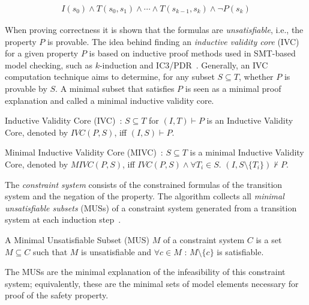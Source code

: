 \begin{gather*}
I(s_0) \land T(s_0, s_1) \land \cdots \land T(s_{k-1}, s_{k})
\land \neg P(s_{k})
\end{gather*}

When proving correctness it is shown that the formulas are \emph{unsatisfiable}, i.e., the property $P$ is provable. The idea behind finding an {\em inductive validity core} (IVC) for a given property $P$ is based on inductive proof methods used in SMT-based model checking, such as $\mathit{k}$-induction and IC3/PDR~\cite{een2011efficient, kahsai2012incremental}. Generally, an IVC computation technique aims to determine, for any subset $S \subseteq T$, whether $\mathit{P}$ is provable by $\mathit{S}$. A minimal subset that satisfies $\mathit{P}$ is seen as a minimal proof explanation and called a minimal inductive validity core. %

\begin{definition}
Inductive Validity Core (IVC)~\cite{GhassabaniGW16}: $S \subseteq T$ for $(I, T) \vdash P$ is an Inductive Validity Core, denoted by $\mathit{IVC(P,S)}$, iff $\mathit{(I,S)} \vdash P$.
\end{definition}

\begin{definition}
Minimal Inductive Validity Core (MIVC)~\cite{Ghassabani2017EfficientGO}: $S \subseteq T$ is a minimal Inductive Validity Core, denoted by $\mathit{MIVC(P,S)}$, iff $\mathit{IVC(P,S)} \land \forall T_i \in S$. $(I, S \setminus \{T_i\}) \not \vdash P$.
\end{definition}

The {\em constraint system} consists of the constrained formulas of the transition system and the negation of the property. The \aivcalg algorithm collects all {\em minimal unsatisfiable subsets} (MUSs) of a constraint system generated from a transition system at each induction step~\cite{Ghassabani2017EfficientGO,bendik2018online}. 

\begin{definition}
A Minimal Unsatisfiable Subset (MUS) $M$ of a constraint system $C$ is a set $M \subseteq C$ such that $M$ is unsatisfiable and $\forall c \in M$ : $M \setminus \{c\}$ is satisfiable.
\end{definition}
The MUSs are the minimal explanation of the infeasibility of this constraint system; equivalently, these are the minimal sets of model elements necessary for proof of the safety property.


